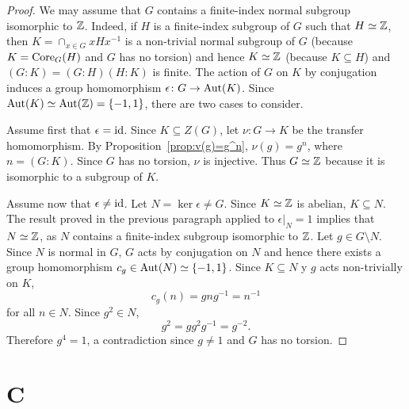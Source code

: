 \begin{proof}
	We may assume that $G$ contains a finite-index normal subgroup isomorphic to $\mathbb{Z}$. Indeed, 
	if $H$ is a finite-index subgroup of $G$ such that $H\simeq\mathbb{Z}$, then 
	$K=\cap_{x\in G}xHx^{-1}$ is a non-trivial normal subgroup of $G$ (because $K=\operatorname{Core}_G(H)$ and 
	$G$ has no torsion) and hence $K\simeq\mathbb{Z}$ (because  
	$K\subseteq H$) and $(G:K)=(G:H)(H:K)$ is finite.
	The action of $G$ on $K$ by conjugation induces a group homomorphism  
	$\epsilon\colon G\to\operatorname{Aut}(K)$. Since $\operatorname{Aut}(K)\simeq\operatorname{Aut}(\mathbb{Z})=\{-1,1\}$, 
	there are two cases to consider.
	
	Assume first that $\epsilon=\operatorname{id}$. Since $K\subseteq Z(G)$, let
	$\nu\colon G\to K$ be the transfer homomorphism. By
	Proposition~\ref{prop:v(g)=g^n}, $\nu(g)=g^n$, where $n=(G:K)$. Since
	$G$ has no torsion, $\nu$ is injective. Thus
	$G\simeq\mathbb{Z}$ because it is isomorphic to a subgroup of $K$.

	Assume now that $\epsilon\ne\operatorname{id}$. Let $N=\ker\epsilon\ne G$. Since
	$K\simeq\mathbb{Z}$ is abelian, $K\subseteq N$. The result proved in the previous paragraph 
	applied to $\epsilon|_N=1$ implies that $N\simeq\mathbb{Z}$, as 
	$N$ contains a finite-index subgroup isomorphic to $\mathbb{Z}$. Let $g\in G\setminus N$. 
	Since $N$ is normal in $G$, $G$ acts by conjugation on $N$ and hence 
	there exists a group homomorphism $c_g\in\operatorname{Aut}(N)\simeq\{-1,1\}$. Since
	$K\subseteq N$ y $g$ acts non-trivially on $K$, 
	\[
	c_g(n)=gng^{-1}=n^{-1}
	\]
	for all $n\in N$.  Since 
	$g^2\in N$, 
	\[
		g^2=gg^2g^{-1}=g^{-2}.
	\]
	Therefore $g^4=1$, a contradiction since $g\ne1$ and $G$ has no torsion.\end{proof}



\section*{C}



